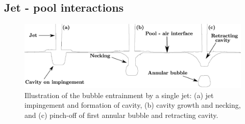 \subsection{Jet - pool interactions}\label{section::jetPool}
\begin{figure}
\centering
\includegraphics[width=\textwidth]{chapters/introduction/EntrainmentSchematic}
\caption{Illustration of the bubble entrainment by a single jet: (a) jet impingement and formation of cavity, (b) cavity growth and necking, and (c) pinch-off of first annular bubble and retracting cavity.}
\label{Figure::EntrainmentSchematic}
\end{figure}
